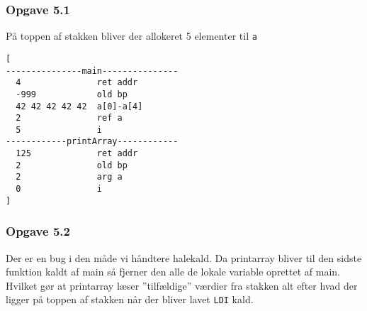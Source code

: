 \subsubsection{Opgave 5.1}
På toppen af stakken bliver der allokeret 5 elementer til \Verb|a| 
\begin{verbatim}
[ 
---------------main---------------
  4               ret addr
  -999            old bp
  42 42 42 42 42  a[0]-a[4]
  2               ref a
  5               i
------------printArray------------
  125             ret addr
  2               old bp
  2               arg a
  0               i
]
\end{verbatim}
\subsubsection{Opgave 5.2}
Der er en bug i den måde vi håndtere halekald. Da printarray bliver til den sidste funktion kaldt af main så fjerner den alle de lokale variable oprettet af main. Hvilket gør at printarray læser ''tilfældige'' værdier fra stakken alt efter hvad der ligger på toppen af stakken når der bliver lavet \Verb|LDI| kald.
